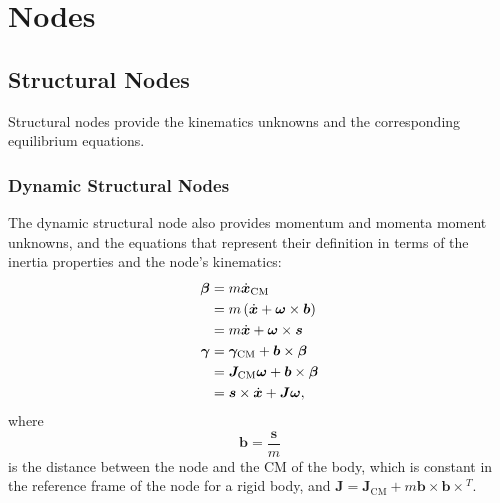 \documentclass[10pt,dvips,fleqn,subeqn]{report}
\newcommand{\T}[1]{\bm{#1}}
\newcommand{\TT}[1]{\bm{#1}}
\begin{document}
\chapter{Nodes}
\label{sec:nodes}

\section{Structural Nodes}
\label{sec:nodes:structural nodes}
Structural nodes provide the kinematics unknowns
and the corresponding equilibrium equations.

\subsection{Dynamic Structural Nodes}
\label{sec:nodes:structural nodes:dynamic structural nodes}
The dynamic structural node also provides momentum and momenta moment
unknowns, and the equations that represent their definition
in terms of the inertia properties and the node's kinematics:
\begin{subequations}
\label{eq:body:momenta}
\begin{align}
	\T{\beta}
	&= m \dot{\T{x}}_{\text{CM}} \nonumber \\
	&= m \plbr{\dot{\T{x}} + \T{\omega}\times\T{b}} \nonumber \\
	&= m \dot{\T{x}} + \T{\omega} \times \T{s}
	\label{eq:body:momentum} \\
	\T{\gamma}
	&= \T{\gamma}_{\text{CM}} + \T{b} \times\T{\beta} \nonumber \\
	&= \TT{J}_{\text{CM}} \T{\omega} + \T{b} \times\T{\beta} \nonumber \\
	&= \T{s} \times \dot{\T{x}} + \TT{J} \T{\omega}
	\label{eq:body:momenta-moment} ,
\end{align}
\end{subequations}
where
\begin{equation}
	\T{b} = \frac{\T{s}}{m}
\end{equation}
is the distance between the node and the CM of the body,
which is constant in the reference frame of the node
for a rigid body,
and $\TT{J} = \TT{J}_\text{CM} + m \T{b}\times \T{b} \times{}^T$.
\end{document}
